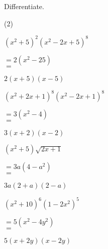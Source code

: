 \clearpage
\noindent Differentiate.
\begin{tasks}(2)
    \task \begin{exercise}$(x^2+5)^2 (x^2-2x+5)^8$
              \begin{envSolution}
                 $ =2(x^2-25)   $\\ 
                 $ =$			 
                     \begin{shortsolution}
  	                    $ 2(x+5)(x-5)$
                     \end{shortsolution}
              \end{envSolution}%
          \end{exercise}
 
    \task \begin{exercise}$(x^2+2x+1)^8 (x^2-2x+1)^8$
              \begin{envSolution}
                 $ =3(x^2-4)   $\\ 
                 $ =$			 
                     \begin{shortsolution}
  	                    $ 3(x+2)(x-2)$
                     \end{shortsolution}
              \end{envSolution}%
          \end{exercise}
 
    \task \begin{exercise}$(x^2+5)\sqrt{2x+1}$
              \begin{envSolution}
                 $ =3a(4-a^2)   $\\ 
                 $ =$			 
                     \begin{shortsolution}
  	                    $ 3a(2+a)(2-a)$
                     \end{shortsolution}
              \end{envSolution}%
          \end{exercise}

    \task \begin{exercise}$(x^2+10)^6 (1-2x^2)^5$
              \begin{envSolution}
                 $ =5(x^2-4y^2)   $\\
                 $ =$			 
                     \begin{shortsolution}
  	                    $ 5(x+2y)(x-2y)$
                     \end{shortsolution}
              \end{envSolution}%
          \end{exercise}
 
\end{tasks}





